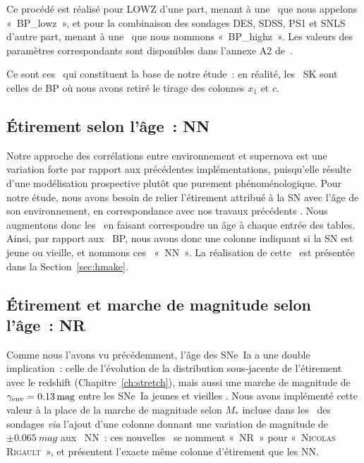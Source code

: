 \documentclass[../main/main.tex]{subfiles}
\begin{document}
Ce procédé est réalisé pour LOWZ d'une part, menant à une \hostlib\ que nous
appelons «~BP\_lowz~», et pour la combinaison des sondages DES, SDSS, PS1 et
SNLS d'autre part, menant à une \hostlib\ que nous nommons «~BP\_highz~». Les
valeurs des paramètres correspondants sont disponibles dans l'annexe A2
de~.

Ce sont ces \hostlib\ qui constituent la base de notre étude~: en réalité, les
\hostlib\ SK sont celles de BP où nous avons retiré le tirage des colonnes $x_1$
et $c$.

\subsection{Étirement selon l'âge~: NN}\label{ssec:nn}

Notre approche des corrélations entre environnement et supernova est une
variation forte par rapport aux précédentes implémentations, puisqu'elle résulte
d'une modélisation prospective plutôt que purement phénoménologique. Pour notre
étude, nous avons besoin de relier l'étirement attribué à la SN avec l'âge de
son environnement, en correspondance avec nos travaux précédents
\citep[][ci-après NN]{nicolas2021}. Nous
augmentons donc les \hostlib\ en faisant correspondre un âge à chaque entrée des
tables. Ainsi, par rapport aux \hostlib\ BP, nous avons donc une colonne
indiquant si la SN est jeune ou vieille, et nommons ces \hostlib\ «~NN~». La
réalisation de cette \hostlib\ est présentée dans la Section~\ref{sec:hmake}.

\subsection{Étirement et marche de magnitude selon l'âge~: NR}\label{ssec:nr}

Comme nous l'avons vu précédemment, l'âge des SNe~Ia a une double implication~:
celle de l'évolution de la distribution sous-jacente de l'étirement avec le
redshift (Chapitre~\ref{ch:stretch}), mais aussi une marche de magnitude de
$\gamma_{\rm env} = \SI{0,13}{mag}$ entre les SNe~Ia jeunes et vieilles
\citep[Chapitre~\ref{ch:stretch},][]{rigault2020}. Nous avons implémenté cette
valeur à la place de la marche de magnitude selon $M_*$ incluse dans les
\wgtmap\ des sondages \textit{via} l'ajout d'une colonne donnant une variation
de magnitude de $\pm\SI{0.065}{mag}$ aux \hostlib\ NN~: ces nouvelles \hostlib\
se nomment «~NR~» pour «~\textsc{Nicolas} \textsc{Rigault}~», et présentent
l'exacte même colonne d'étirement que les NN.
\end{document}
